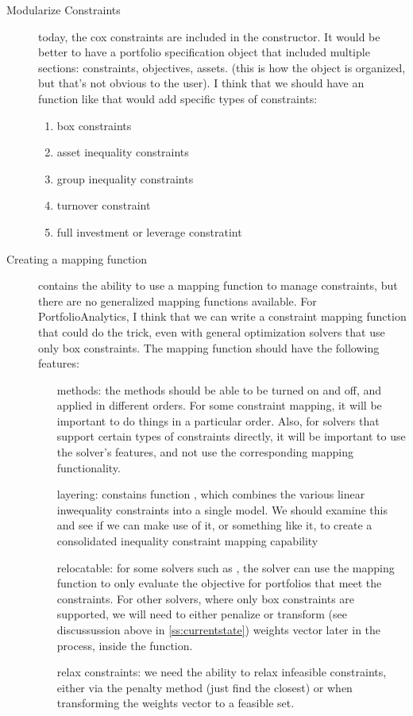 \documentclass[12pt,letterpaper,english]{article}
\begin{document}
\begin{description}
\item[Modularize Constraints] today, the cox constraints are included in the  constructor.  It would be better to have a portfolio specification object that included multiple sections: constraints, objectives, assets. (this is how the object is organized, but that's not obvious to the user).  I think that we should have an  function like  that would add specific types of constraints:
	\begin{enumerate}
	\item box constraints
	\item asset inequality constraints
	\item group inequality constraints
	\item turnover constraint
	\item full investment or leverage constratint
	\end{enumerate}

\item[Creating a mapping function] 

 contains the ability to use a mapping function to manage constraints, but there are no generalized mapping functions available.  For PortfolioAnalytics, I think that we can write a constraint mapping function that could do the trick, even with general optimization solvers that use only box constraints.
The mapping function should have the following features:
	\begin{itemize}
		\item[methods:] the methods should be able to be turned on and off, and applied in different orders.  For some constraint mapping, it will be important to do things in a particular order.  Also, for solvers that support certain types of constraints directly, it will be important to use the solver's features, and not use the corresponding mapping functionality.
		\item[layering:]  constains function , which combines the various linear inwequality constraints into a single model.  We should examine this and see if we can make use of it, or something like it, to create a consolidated inequality constraint mapping capability
		\item[relocatable:] for some solvers such as , the solver can use the mapping function to only evaluate the objective for portfolios that meet the constraints.  For other solvers, where only box constraints are supported, we will need to either penalize or transform (see discussussion above in \ref{ss:currentstate}) weights vector later in the process, inside the  function.
		\item[relax constraints:]we need the ability to relax infeasible constraints, either via the penalty method (just find the closest) or when transforming the weights vector to a feasible set.
	\end{itemize}
	

\end{description}
\end{document}
